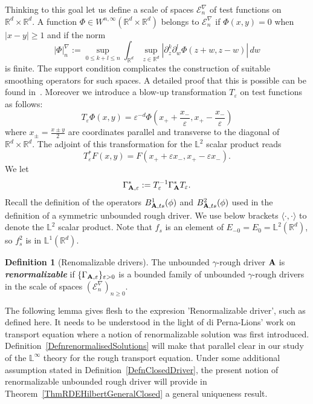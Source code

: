 \documentclass[11pt,a4paper]{amsart}
\newcommand{\RR}{\mathbb{R}}  \newcommand{\CC}{\mathbb{C}}  \newcommand{\LL}{\mathbb{L}}  \newcommand{\WW}{\mathbb{W}}
\newcommand{\mcE}{\mathcal{E}}
\newcommand{\varep}{\varepsilon}
\renewcommand{\geq}{\geqslant}
\theoremstyle{plain}%
\theoremstyle{definition}
\newtheorem{definition}[theorem]{Definition}
\theoremstyle{remark}
\numberwithin{equation}{section} %
\begin{document}
Thinking to this goal let us define a scale of spaces $\mcE^\nabla_n$ of test functions on  $\RR^d \times \RR^d$. A function $\Phi \in W^{n,\infty}(\RR^d \times \RR^d)$ belongs to $\mcE^\nabla_n$ if $\Phi(x,y)=0$ when $|x-y|\ge 1$ and if the norm
$$
| \Phi |^\nabla_n :=\sup_{0\le k+l\le n}  \int_{\RR^d} \sup_{z\in\RR^d} |\partial_z^k \partial_w^l\Phi(z+w, z-w)|\, dw
$$ is finite. The support condition complicates the construction of suitable smoothing operators for such spaces. A detailed proof that this is possible can be found in~\cite{deya_priori_2016}.
Moreover we introduce a blow-up transformation $T_\varepsilon$ on test functions as follows:
$$
T_\varepsilon \Phi(x,y) =\varepsilon^{-d} \Phi(x_+ + \frac{x_-}{\varep}, x_+ - \frac{x_-}{\varep}) 
$$
where $x_\pm = \frac{x \pm y}{2}$ are coordinates parallel and transverse to the diagonal of $\RR^d \times \RR^d$. 
%
%
The adjoint of this transformation for the $\LL^2$ scalar product reads
$$
T^*_\varepsilon F(x,y) = F(x_+ + \varepsilon x_- , x_+ -\varepsilon x_-).
$$
We let  
$$
\Gamma^{\ast}_{\bf A,\varepsilon} := T_\varepsilon^{-1}\Gamma_{\bf A}^{\ast}T_\varepsilon.
$$ 
Recall the definition of the operators $ B^1_{{\bf A},ts}(\phi)$ and $ B^2_{{\bf A},ts}(\phi)$ used in the definition of a symmetric unbounded rough driver. We use below brackets $\langle\cdot,\cdot\rangle$ to denote the $\LL^2$ scalar product. Note that $f_s$ is an element of $E_{-0} = E_0 = \LL^2(\RR^d)$, so $f_s^2$ is in $\LL^1(\RR^d)$. 
 
\begin{definition}[Renomalizable drivers]
The unbounded $\gamma$-rough driver $\bf A$ is \textbf{\emph{renormalizable}} if $\{\Gamma_{\bf A,\varepsilon}\}_{\varepsilon>0}$  is a bounded family of unbounded $\gamma$-rough drivers in the scale of spaces $(\mcE^\nabla_n)_{n\geq 0}$.
\end{definition} 

The following lemma gives flesh to the expresion 'Renormalizable driver', such as defined here. It needs to be understood in the light of di Perna-Lions' work on transport equation \cite{diPernaLions} where a notion of renormalizable solution was first introduced. Definition~\ref{DefnrenormalisedSolutions} will make that parallel clear in our study of the $\LL^\infty$ theory for the rough transport equation. Under some additional assumption stated in Definition~\ref{DefnClosedDriver}, the present notion of renormalizable unbounded rough driver will provide in Theorem~\ref{ThmRDEHilbertGeneralClosed} a general uniqueness result.  
\end{document}
